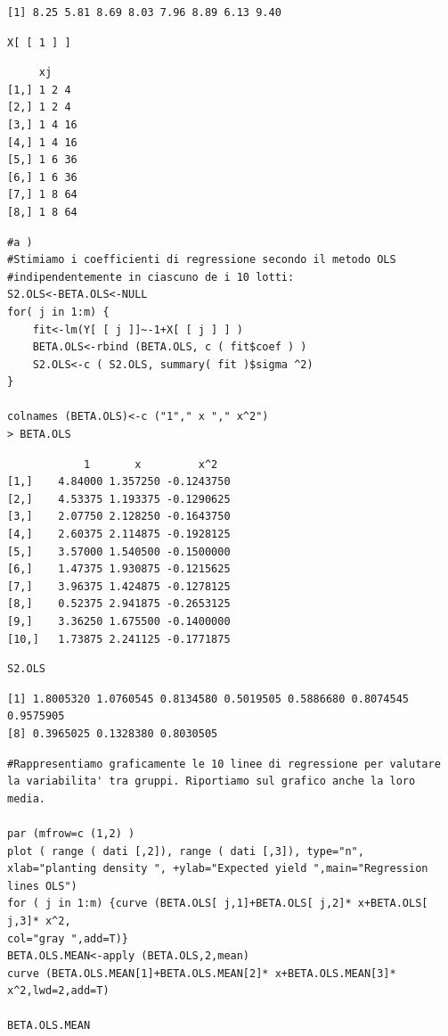 {
\color{red}
\begin{verbatim}
[1] 8.25 5.81 8.69 8.03 7.96 8.89 6.13 9.40    
\end{verbatim}
}

\begin{lstlisting}[style=R]
X[ [ 1 ] ]
\end{lstlisting}

{
\color{red}
\begin{verbatim}
     xj
[1,] 1 2 4
[2,] 1 2 4
[3,] 1 4 16
[4,] 1 4 16
[5,] 1 6 36
[6,] 1 6 36
[7,] 1 8 64
[8,] 1 8 64
\end{verbatim}
}

\begin{lstlisting}[style=R]
#a )
#Stimiamo i coefficienti di regressione secondo il metodo OLS
#indipendentemente in ciascuno de i 10 lotti:
S2.OLS<-BETA.OLS<-NULL
for( j in 1:m) {
    fit<-lm(Y[ [ j ]]~-1+X[ [ j ] ] )
    BETA.OLS<-rbind (BETA.OLS, c ( fit$coef ) )
    S2.OLS<-c ( S2.OLS, summary( fit )$sigma ^2)
}

colnames (BETA.OLS)<-c ("1"," x "," x^2")
> BETA.OLS
\end{lstlisting}

{
\color{red}
\begin{Verbatim}
            1       x         x^2
[1,]    4.84000 1.357250 -0.1243750
[2,]    4.53375 1.193375 -0.1290625
[3,]    2.07750 2.128250 -0.1643750
[4,]    2.60375 2.114875 -0.1928125
[5,]    3.57000 1.540500 -0.1500000
[6,]    1.47375 1.930875 -0.1215625
[7,]    3.96375 1.424875 -0.1278125
[8,]    0.52375 2.941875 -0.2653125
[9,]    3.36250 1.675500 -0.1400000
[10,]   1.73875 2.241125 -0.1771875
\end{Verbatim}
}

\begin{lstlisting}[style=R]
S2.OLS
\end{lstlisting}

{
\color{red}
\begin{Verbatim}
[1] 1.8005320 1.0760545 0.8134580 0.5019505 0.5886680 0.8074545 0.9575905
[8] 0.3965025 0.1328380 0.8030505
\end{Verbatim}
}



\begin{lstlisting}[style=R]
#Rappresentiamo graficamente le 10 linee di regressione per valutare la variabilita' tra gruppi. Riportiamo sul grafico anche la loro media.

par (mfrow=c (1,2) )
plot ( range ( dati [,2]), range ( dati [,3]), type="n", xlab="planting density ", +ylab="Expected yield ",main="Regression lines OLS")
for ( j in 1:m) {curve (BETA.OLS[ j,1]+BETA.OLS[ j,2]* x+BETA.OLS[ j,3]* x^2,
col="gray ",add=T)}
BETA.OLS.MEAN<-apply (BETA.OLS,2,mean)
curve (BETA.OLS.MEAN[1]+BETA.OLS.MEAN[2]* x+BETA.OLS.MEAN[3]* x^2,lwd=2,add=T)

BETA.OLS.MEAN
\end{lstlisting}

